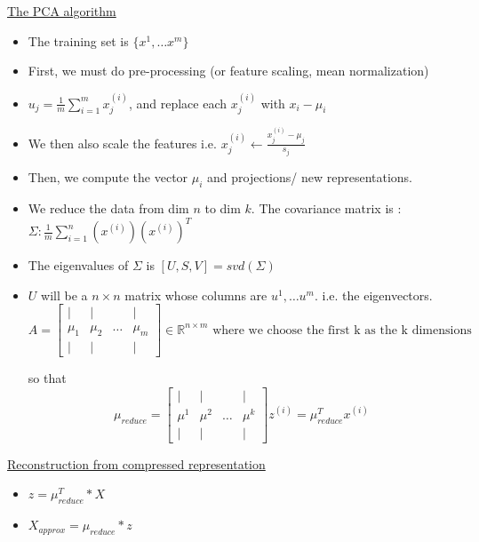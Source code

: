 \documentclass[12pt]{article}
\begin{document}
\underline{The PCA algorithm}

\begin{itemize}
	\item The training set is $\{x^1,\ldots x^m\}$
	\item First, we must do pre-processing (or feature scaling, mean normalization)
	\item $u_j=\frac{1}{m}\sum_{i=1}^{m}x_j^{(i)}$, and replace each $x_j^{(i)}$ with $x_i-\mu_i$
	\item We then also scale the features i.e. $x_j^{(i)} \leftarrow \frac{x_j^{(i)}-\mu_j}{s_j}$
	\item Then, we compute the vector $\mu_i$ and projections/ new representations.
	\item We reduce the data from dim $n$ to dim $k$.
	The covariance matrix is : $\Sigma :\frac{1}{m}\sum_{i=1}^{n}(x^{(i)})(x^{(i)})^T $
	\item The eigenvalues of $\Sigma$ is $ [U,S,V] = svd( \Sigma) $
	\item $U$ will be a $n\times n$ matrix whose columns are $u^1,\ldots u^m$. i.e. the eigenvectors.
\[
A = 
\left[
\begin{array}{cccc}
\mid & \mid &        & \mid \\
\mu_{1}    & \mu_{2}    & \ldots & \mu_{m}    \\
\mid & \mid &        & \mid 
\end{array}
\right] \in \mathbb{R}^{n\times m} \text{ where we choose the first k as the k dimensions}\]

so that 
\[
\mu_{reduce} = 
\left[
\begin{array}{cccc}
\mid & \mid &        & \mid \\
\mu^{1}    & \mu^{2}    & \ldots & \mu^{k}    \\
\mid & \mid &        & \mid 
\end{array}
\right]
 z^{(i)} = \mu_{reduce}^Tx^{(i)}
\]
\end{itemize}

\underline{Reconstruction from compressed representation}
\begin{itemize}
	\item $z=\mu_{reduce}^T*X$
	\item $X_{approx} = \mu_{reduce}*z$
\end{itemize}
\end{document}
